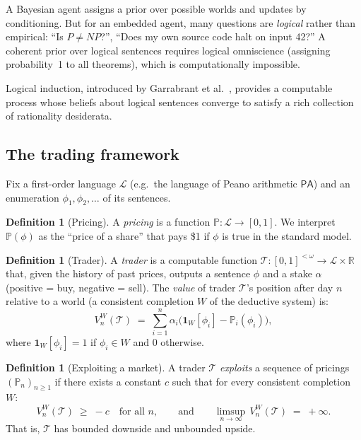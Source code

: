 \documentclass[11pt,a4paper]{article}
\theoremstyle{definition}
\newtheorem{definition}[theorem]{Definition}
\theoremstyle{remark}
\newcommand{\R}{\mathbb{R}}
\newcommand{\PA}{\mathsf{PA}}
\begin{document}
A Bayesian agent assigns a prior over possible worlds and updates by
conditioning.  But for an embedded agent, many questions are
\emph{logical} rather than empirical: ``Is $P \neq NP$?'', ``Does my
own source code halt on input 42?''  A coherent prior over logical
sentences requires logical omniscience (assigning probability~1 to all
theorems), which is computationally impossible.

Logical induction, introduced by Garrabrant et al.~\cite{garrabrant2016logical},
provides a computable process whose beliefs about logical sentences
converge to satisfy a rich collection of rationality desiderata.

\subsection{The trading framework}

Fix a first-order language $\mathcal{L}$ (e.g.\ the language of Peano
arithmetic $\PA$) and an enumeration $\phi_1, \phi_2, \ldots$ of its
sentences.

\begin{definition}[Pricing]
A \emph{pricing} is a function $\mathbb{P} : \mathcal{L} \to [0,1]$.
We interpret $\mathbb{P}(\phi)$ as the ``price of a share'' that pays
\$1 if $\phi$ is true in the standard model.
\end{definition}

\begin{definition}[Trader]
A \emph{trader} is a computable function
$\mathcal{T} : [0,1]^{<\omega} \to \mathcal{L} \times \R$
that, given the history of past prices, outputs a sentence $\phi$
and a stake $\alpha$ (positive = buy, negative = sell).
The \emph{value} of trader $\mathcal{T}$'s position after day $n$
relative to a world (a consistent completion $W$ of the deductive
system) is:
\[
  V_n^W(\mathcal{T}) \;=\; \sum_{i=1}^{n} \alpha_i \bigl(
    \mathbf{1}_W[\phi_i] - \mathbb{P}_i(\phi_i)
  \bigr),
\]
where $\mathbf{1}_W[\phi_i] = 1$ if $\phi_i \in W$ and $0$ otherwise.
\end{definition}

\begin{definition}[Exploiting a market]
A trader $\mathcal{T}$ \emph{exploits} a sequence of pricings
$(\mathbb{P}_n)_{n \geq 1}$ if there exists a constant $c$ such that
for every consistent completion $W$:
\[
  V_n^W(\mathcal{T}) \;\geq\; -c \quad\text{for all } n,
  \qquad\text{and}\qquad
  \limsup_{n \to \infty}\, V_n^W(\mathcal{T}) \;=\; +\infty.
\]
That is, $\mathcal{T}$ has bounded downside and unbounded upside.
\end{definition}
\end{document}
